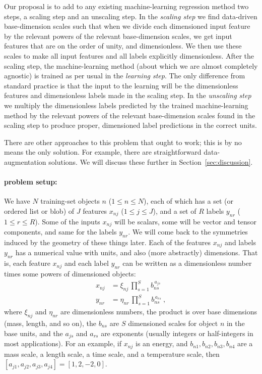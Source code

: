 \documentclass[12pt, letterpaper]{article}
\newcommand{\sectionname}{Section}
\newcommand{\secref}[1]{\sectionname~\ref{#1}}
\begin{document}
Our proposal is to add to any existing machine-learning regression method two steps, a scaling step and an unscaling step.
In the \emph{scaling step} we find data-driven base-dimension scales such that when we divide each dimensioned input feature by the relevant powers of the relevant base-dimension scales, we get input features that are on the order of unity, and dimensionless.
We then use these scales to make all input features and all labels explicitly dimensionless.
After the scaling step, the machine-learning method (about which we are almost completely agnostic) is trained as per usual in the \emph{learning step}.
The only difference from standard practice is that the input to the learning will be the dimensionless features and dimensionless labels made in the scaling step.
In the \emph{unscaling step} we multiply the dimensionless labels predicted by the trained machine-learning method by the relevant powers of the relevant base-dimension scales found in the scaling step to produce proper, dimensioned label predictions in the correct units.

There are other approaches to this problem that ought to work; this is by no means the only solution.
For example, there are straightforward data-augmentation solutions.
We will discuss these further in \secref{sec:discussion}.

\paragraph{problem setup:} 
We have $N$ training-set objects $n$ ($1\leq n\leq N$), each of which has a set (or ordered list or blob) of $J$ features $x_{nj}$ ($1\leq j\leq J$), and a set of $R$ labels $y_{nr}$ ($1\leq r\leq R$).
Some of the inputs $x_{nj}$ will be scalars, some will be vector and tensor components, and same for the labels $y_{nr}$.
We will come back to the symmetries induced by the geometry of these things later.
Each of the features $x_{nj}$ and labels $y_{nr}$ has a numerical value with units, and also (more abstractly) dimensions.
That is, each feature $x_{nj}$ and each label $y_{nr}$ can be written as a dimensionless number times some powers of dimensioned objects:
\begin{align}\label{eq:xnj}
    x_{nj} &= \xi_{nj} \,\prod_{s=1}^S b_{ns}^{\,a_{js}} \\
    y_{nr} &= \eta_{nr}\,\prod_{s=1}^S b_{ns}^{\,a_{rs}} ~,
\end{align}
where $\xi_{nj}$ and $\eta_{nr}$ are dimensionless numbers, the product is over base dimensions (mass, length, and so on), the $b_{ns}$ are $S$ dimensioned scales for object $n$ in the base units, and the $a_{js}$ and $a_{rs}$ are exponents (usually integers or half-integers in most applications).
For an example, if $x_{nj}$ is an energy, and $b_{n1}, b_{n2}, b_{n3}, b_{n4}$ are a mass scale, a length scale, a time scale, and a temperature scale, then $[a_{j1}, a_{j2}, a_{j3}, a_{j4}] = [1, 2, -2, 0]$.
\end{document}
